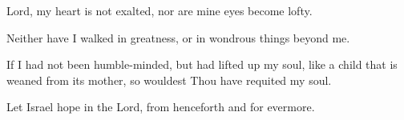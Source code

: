 Lord, my heart is not exalted, nor are mine eyes become lofty.

Neither have I walked in greatness, or in wondrous things beyond me.

If I had not been humble-minded, but had lifted up my soul, like a child that is weaned from its mother, so wouldest Thou have requited my soul.

Let Israel hope in the Lord, from henceforth and for evermore.
